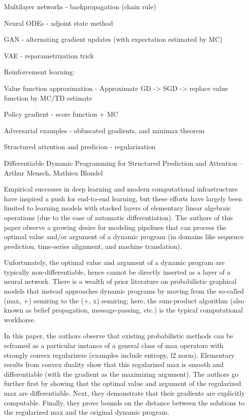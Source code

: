 \documentclass[english]{article}
\begin{document}
\item Multilayer networks - backpropagation (chain rule)

\item Neural ODEs - adjoint state method

\item GAN - alternating gradient updates (with expectation estimated by MC)

\item VAE - reparametrization trick

\item Reinforcement learning: 

\bitem 
\item
Value function approximation - Approximate GD -> SGD -> replace value function by MC/TD estimate
\item
Policy gradient - score function + MC
\eitem 

\item Adversarial examples - obfuscated gradients, and minimax theorem


\item Structured attention and predicion - regularization

Differentiable Dynamic Programming for Structured Prediction and Attention – Arthur Mensch, Mathieu Blondel

Empirical successes in deep learning and modern computational infrastructure have inspired a push for end-to-end learning, but these efforts have largely been limited to learning models with stacked layers of elementary linear algebraic operations (due to the ease of automatic differentiation). The authors of this paper observe a growing desire for modeling pipelines that can process the optimal value and/or argument of a dynamic program (in domains like sequence prediction, time-series alignment, and machine translation).

Unfortunately, the optimal value and argument of a dynamic program are typically non-differentiable, hence cannot be directly inserted as a layer of a neural network. There is a wealth of prior literature on probabilistic graphical models that instead approaches dynamic programs by moving from the so-called (max, +) semiring to the (+, x) semiring; here, the sum-product algorithm (also known as belief propagation, message-passing, etc.) is the typical computational workhorse.

In this paper, the authors observe that existing probabilistic methods can be reframed as a particular instance of a general class of max operators with strongly convex regularizers (examples include entropy, l2 norm). Elementary results from convex duality show that this regularized max is smooth and differentiable (with the gradient as the maximizing argument). The authors go further first by showing that the optimal value and argument of the regularized max are differentiable. Next, they demonstrate that their gradients are explicitly computable. Finally, they prove bounds on the distance between the solutions to the regularized max and the original dynamic program. 
\end{document}
